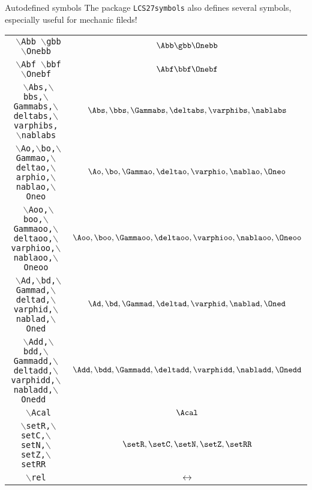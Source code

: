 \documentclass[aspectratio=169]{beamer}
\begin{document}
\begin{frame}{Autodefined symbols}
The package \texttt{LCS27symbols} also defines several symbols, especially useful for mechanic fileds!
\begin{table}[h]
\centering
\begin{tabular}{|c|c|}
\hline
\texttt{   $\backslash$Abb $\backslash$gbb $\backslash$Onebb}& $   \Abb \gbb \Onebb$\\
\texttt{    $\backslash$Abf $\backslash$bbf $\backslash$Onebf} & $   \Abf \bbf \Onebf$\\
\texttt{    $\backslash$Abs,$\backslash$bbs,$\backslash$Gammabs,$\backslash$deltabs,$\backslash$varphibs, $\backslash$nablabs}& $     \Abs,\bbs,\Gammabs,\deltabs,\varphibs, \nablabs   $\\
\texttt{   $\backslash$Ao,$\backslash$bo,$\backslash$Gammao,$\backslash$deltao,$\backslash$arphio,$\backslash$nablao,$\backslash$Oneo}& $     \Ao,\bo,\Gammao,\deltao,\varphio,\nablao,\Oneo    $\\
\texttt{   $\backslash$Aoo,$\backslash$boo,$\backslash$Gammaoo,$\backslash$deltaoo,$\backslash$varphioo,$\backslash$nablaoo,$\backslash$Oneoo}& $     \Aoo,\boo,\Gammaoo,\deltaoo,\varphioo,\nablaoo    ,\Oneoo$\\
\texttt{   $\backslash$Ad,$\backslash$bd,$\backslash$Gammad,$\backslash$deltad,$\backslash$varphid,$\backslash$nablad,$\backslash$Oned} & $     \Ad,\bd,\Gammad,\deltad,\varphid,\nablad,\Oned    $\\
\texttt{   $\backslash$Add,$\backslash$bdd,$\backslash$Gammadd,$\backslash$deltadd,$\backslash$varphidd,$\backslash$nabladd,$\backslash$Onedd } & $     \Add,\bdd,\Gammadd,\deltadd,\varphidd,\nabladd,\Onedd $\\
\texttt{   $\backslash$Acal}& $     \Acal $\\
\texttt{   $\backslash$setR,$\backslash$setC,$\backslash$setN,$\backslash$setZ,$\backslash$setRR }& $     \setR,\setC,\setN,\setZ,\setRR    $\\
\texttt{   $\backslash$rel }& $     \rel  $\\
\hline
\end{tabular}
\end{table}
\end{frame}
\end{document}
